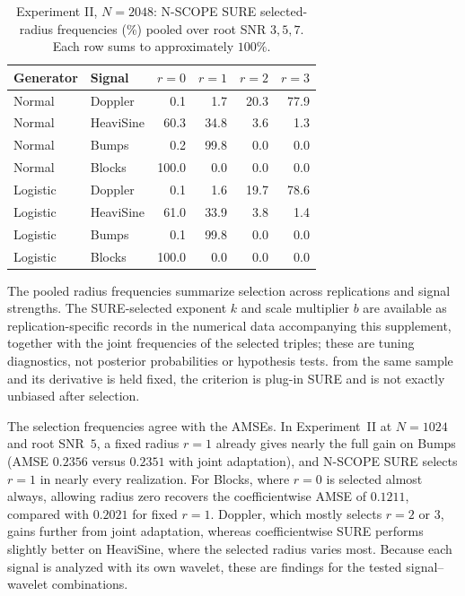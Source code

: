 \documentclass[11pt]{article}
\numberwithin{equation}{section}
\begin{document}
\begin{table}[H]
\centering\small
\caption{Experiment II, $N=2048$: N-SCOPE SURE selected-radius frequencies (\%) pooled over root SNR $3,5,7$. Each row sums to approximately $100\%$.}
\label{tab:s5-radius-2048}
\setlength{\tabcolsep}{5pt}
\begin{tabular}{llrrrr}
\toprule
Generator & Signal & $r=0$ & $r=1$ & $r=2$ & $r=3$ \\
\midrule
Normal & Doppler & 0.1 & 1.7 & 20.3 & 77.9 \\
Normal & HeaviSine & 60.3 & 34.8 & 3.6 & 1.3 \\
Normal & Bumps & 0.2 & 99.8 & 0.0 & 0.0 \\
Normal & Blocks & 100.0 & 0.0 & 0.0 & 0.0 \\
Logistic & Doppler & 0.1 & 1.6 & 19.7 & 78.6 \\
Logistic & HeaviSine & 61.0 & 33.9 & 3.8 & 1.4 \\
Logistic & Bumps & 0.1 & 99.8 & 0.0 & 0.0 \\
Logistic & Blocks & 100.0 & 0.0 & 0.0 & 0.0 \\
\bottomrule
\end{tabular}
\end{table}


The pooled radius frequencies summarize selection across replications and signal strengths. The SURE-selected exponent $k$ and scale multiplier $b$ are available as replication-specific records in the numerical data accompanying this supplement, together with the joint frequencies of the selected triples; these are tuning diagnostics, not posterior probabilities or hypothesis tests.
from the same sample and its derivative is held fixed, the criterion
is plug-in SURE and is not exactly unbiased after selection.

The selection frequencies agree with the AMSEs. In Experiment~II at $N=1024$ and root SNR~$5$, a fixed radius $r=1$ already gives nearly the full gain on Bumps (AMSE $0.2356$ versus $0.2351$ with joint adaptation), and N-SCOPE SURE selects $r=1$ in nearly every realization. For Blocks, where $r=0$ is selected almost always, allowing radius zero recovers the coefficientwise AMSE of $0.1211$, compared with $0.2021$ for fixed $r=1$. Doppler, which mostly selects $r=2$ or $3$, gains further from joint adaptation, whereas coefficientwise SURE performs slightly better on HeaviSine, where the selected radius varies most. Because each signal is analyzed with its own wavelet, these are findings for the tested signal--wavelet combinations.
\end{document}
